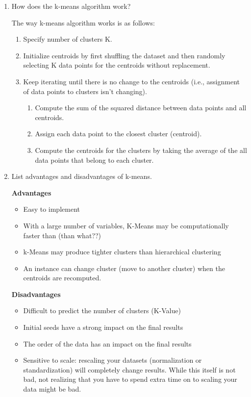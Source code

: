 \documentclass[12pt]{article}
\newenvironment{QandA}{\begin{enumerate}[label=\bfseries\arabic*.]\bfseries}
{\end{enumerate}}
\newenvironment{answered}{\par\normalfont\color{Sepia}}{}
\begin{document}
\begin{QandA}
    \item How does the k-means algorithm work?
    \begin{answered}
        The way k-means algorithm works is as follows:
        \begin{enumerate}
            \item Specify number of clusters K.
            \item Initialize centroids by first shuffling the dataset and then randomly selecting K data points for the centroids without replacement.
            \item Keep iterating until there is no change to the centroids (i.e., assignment of data points to clusters isn’t changing).
            \begin{enumerate}
                \item Compute the sum of the squared distance between data points and all centroids.
                \item Assign each data point to the closest cluster (centroid).
                \item Compute the centroids for the clusters by taking the average of the all data points that belong to each cluster.
            \end{enumerate}
        \end{enumerate}
    \end{answered}

    \item List advantages and disadvantages of k-means.
    \begin{answered}
        \textbf{Advantages}
        \begin{itemize}
            \item  Easy to implement
            \item With a large number of variables, K-Means may be computationally faster than (than what??)
            \item k-Means may produce tighter clusters than hierarchical clustering
            \item An instance can change cluster (move to another cluster) when the centroids are recomputed.
        \end{itemize}

        \textbf{Disadvantages}
        \begin{itemize}
            \item Difficult to predict the number of clusters (K-Value)
            \item Initial seeds have a strong impact on the final results
            \item The order of the data has an impact on the final results
            \item Sensitive to scale: rescaling your datasets (normalization or standardization) will completely change results. While this itself is not bad, not realizing that you have to spend extra time on to scaling your data might be bad.
        \end{itemize}
    \end{answered}
\end{QandA}
\end{document}
